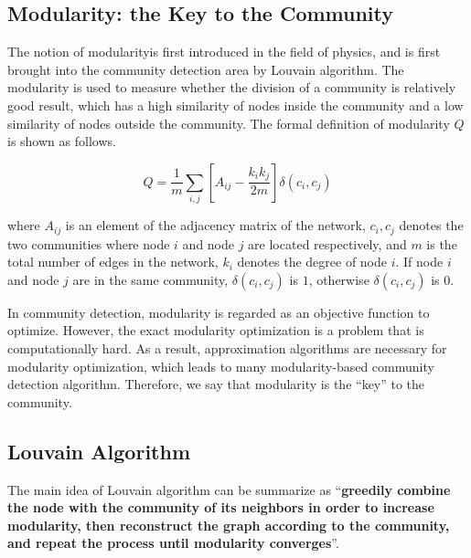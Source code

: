 \documentclass[12pt, a4paper]{article}
\theoremstyle{definition}
\begin{document}
\subsection{Modularity: the Key to the Community}

The notion of modularity\footnotemark[3] is first introduced in the field of physics, and is first brought into the community detection area by Louvain algorithm\footnotemark[1]. The modularity is used to measure whether the division of a community is relatively good result, which has a high similarity of nodes inside the community and a low similarity of nodes outside the community. The formal definition of modularity $Q$ is shown as follows.

$$
Q = \frac{1}{m} \sum_{i,j} \left[A_{ij} - \frac{k_ik_j}{2m}\right]\delta(c_i, c_j)
$$

where $A_{ij}$ is an element of the adjacency matrix of the network, $c_i, c_j$ denotes the two communities where node $i$ and node $j$ are located respectively, and $m$ is the total number of edges in the network, $k_i$ denotes the degree of node $i$. If node $i$ and node $j$ are in the same community, $\delta(c_i, c_j)$ is $1$, otherwise $\delta(c_i,c_j)$ is $0$.


In community detection, modularity is regarded as an objective function to optimize. However, the exact modularity optimization is a problem that is computationally hard\footnotemark[3]. As a result, approximation algorithms are necessary for modularity optimization, which leads to many modularity-based community detection algorithm. Therefore, we say that modularity is the ``key'' to the community.

\subsection{Louvain Algorithm}

The main idea of Louvain algorithm can be summarize as ``\textbf{greedily combine the node with the community of its neighbors in order to increase modularity, then reconstruct the graph according to the community, and repeat the process until modularity converges}''.
\end{document}
